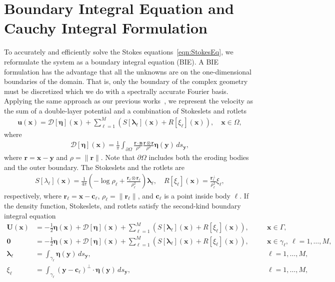 \documentclass[3p]{elsarticle}
\newcommand{\bd}{{\partial}}
\newcommand{\cc}{{\mathbf{c}}}
\newcommand{\DDD}{{\boldsymbol{\mathcal D}}}
\newcommand{\eeta}{{\boldsymbol\eta}}
\newcommand{\llambda}{{\boldsymbol\lambda}}
\newcommand{\nn}{{\mathbf{n}}}
\newcommand{\rr}{{\mathbf{r}}}
\newcommand{\uu}{{\mathbf{u}}}
\newcommand{\UU}{{\mathbf{U}}}
\newcommand{\xx}{{\mathbf{x}}}
\newcommand{\yy}{{\mathbf{y}}}
\begin{document}
\section{Boundary Integral Equation and Cauchy Integral Formulation}
\label{sec:DLP}
To accurately and efficiently solve the Stokes equations~\eqref{eqn:StokesEq}, we reformulate the system as a boundary integral equation (BIE). A BIE formulation has the advantage that all the unknowns are on the one-dimensional boundaries of the domain. That is, only the boundary of the complex geometry must be discretized which we do with a spectrally accurate Fourier basis. Applying the same approach as our previous works~\cite{chiu2020viscous, quaife2018boundary}, we represent the velocity as the sum of a double-layer potential and a combination of Stokeslets and rotlets~\cite{pow-mir1987}
\begin{align}
  \uu(\xx) = \DDD[\eeta](\xx) + \sum_{\ell=1}^{M}\left(
    S[\llambda_\ell](\xx) + R[\xi_\ell](\xx)\right), 
    \quad \xx \in \Omega,
  \label{eqn:velocity}
\end{align}
where 
\begin{align}
  \DDD[\eeta](\xx) = \frac{1}{\pi}\int_{\bd\Omega} 
  \frac{\rr \cdot \nn}{\rho^2} \frac{\rr \otimes \rr}{\rho^2}
  \eeta(\yy) \, ds_\yy,
  \label{eqn:velocityDLP}
\end{align}
where $\rr = \xx - \yy$ and $\rho = \|\rr\|$. Note that $\bd\Omega$ includes both the eroding bodies and the outer boundary. The Stokeslets and the rotlets are
\begin{align}
  S[\lambda_\ell](\xx) = \frac{1}{4\pi} \left(-\log \rho_\ell +
  \frac{\rr_\ell \otimes \rr_\ell}{\rho_\ell^2} \right) \llambda_\ell,
  \quad
  R[\xi_\ell](\xx) = \frac{\rr_\ell^\perp}{\rho_\ell^2}\xi_\ell,
\end{align}
respectively, where $\rr_\ell = \xx - \cc_\ell$, $\rho_\ell = \|\rr_\ell\|$, and $\cc_\ell$ is a point inside body $\ell$. If the density function, Stokeslets, and rotlets satisfy the second-kind boundary integral equation
\begin{subequations}
  \label{eqn:FredBIE}
  \begin{alignat}{3}
    \UU(\xx) &= -\frac{1}{2}\eeta(\xx) + \DDD[\eeta](\xx) + 
      \sum_{\ell=1}^{M}\left(S[\llambda_\ell](\xx) + R[\xi_\ell](\xx)\right), 
      \quad &&\xx \in \Gamma, \\
    \mathbf{0} &= -\frac{1}{2}\eeta(\xx) + \DDD[\eeta](\xx) + 
      \sum_{\ell=1}^{M}\left(S[\llambda_\ell](\xx) + R[\xi_\ell](\xx)\right), 
      &&\xx \in \gamma_\ell, \: \ell = 1,\ldots,M, \\
    \llambda_\ell &= \int_{\gamma_\ell} \eeta(\yy) \, ds_\yy, 
      &&\ell = 1,\ldots,M, \\
    \xi_\ell &= \int_{\gamma_\ell} (\yy - \cc_\ell)^\perp \cdot 
      \eeta(\yy) \, ds_\yy, &&\ell = 1,\ldots,M,
  \end{alignat}
\end{subequations}
\end{document}
